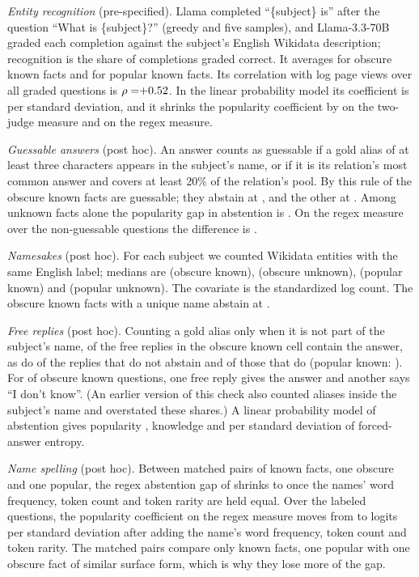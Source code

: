 \documentclass{article}
\newcommand{\idk}{``I don't know''}
\begin{document}
\emph{Entity recognition} (pre-specified). Llama completed ``\{subject\} is'' after the question ``What is \{subject\}?'' (greedy and five samples), and Llama-3.3-70B graded each completion against the subject's English Wikidata description; recognition is the share of completions graded correct. It averages \ekObsKnown{} for obscure known facts and \ekPopKnown{} for popular known facts. Its correlation with log page views over all graded questions is $\rho=\ekRho$. In the linear probability model its coefficient is \ekCoef{} \ekCoefCI{} per standard deviation, and it shrinks the popularity coefficient by \ekShrink{} on the two-judge measure and \ekShrinkRegex{} on the regex measure.

\emph{Guessable answers} (post hoc). An answer counts as guessable if a gold alias of at least three characters appears in the subject's name, or if it is its relation's most common answer and covers at least 20\% of the relation's pool. By this rule \rcGuessN{} of the \gsObsKnownTotal{} obscure known facts are guessable; they abstain at \rcGuessAbs, and the other \rcNonGuessN{} at \rcNonGuessAbs. Among unknown facts alone the popularity gap in abstention is \hmLlamaPopUnkOnly{} \hmLlamaPopUnkOnlyCI. On the regex measure over the \gsRegexN{} non-guessable questions the difference is \gsRegexDiff{} \gsRegexDiffCI.

\emph{Namesakes} (post hoc). For each subject we counted Wikidata entities with the same English label; medians are \amObsKnownHom{} (obscure known), \amObsUnkHom{} (obscure unknown), \amPopKnownHom{} (popular known) and \amPopUnkHom{} (popular unknown). The covariate is the standardized log count. The \amSingleN{} obscure known facts with a unique name abstain at \amSingle.

\emph{Free replies} (post hoc). Counting a gold alias only when it is not part of the subject's name, \ecAll{} of the free replies in the obscure known cell contain the answer, as do \ecNonAbs{} of the replies that do not abstain and \ecAbs{} of those that do (popular known: \ecPopKnown). For \ecBoth{} of \ecBothOf{} obscure known questions, one free reply gives the answer and another says \idk. (An earlier version of this check also counted aliases inside the subject's name and overstated these shares.) A linear probability model of abstention gives popularity \rcPopEnt{} \rcPopEntCI, knowledge \rcKnowEnt{} \rcKnowEntCI{} and \rcEntCoef{} per standard deviation of forced-answer entropy.

\emph{Name spelling} (post hoc). Between \scPopKnownPairs{} matched pairs of known facts, one obscure and one popular, the regex abstention gap of \scPopKnownGap{} shrinks to \scPopKnownGapSurface{} \scPopKnownGapSurfaceCI{} once the names' word frequency, token count and token rarity are held equal. Over the \faLlamaN{} labeled questions, the popularity coefficient on the regex measure moves from \scPoolPop{} to \scPoolPopSurface{} logits per standard deviation after adding the name's word frequency, token count and token rarity. The matched pairs compare only known facts, one popular with one obscure fact of similar surface form, which is why they lose more of the gap.
\end{document}
